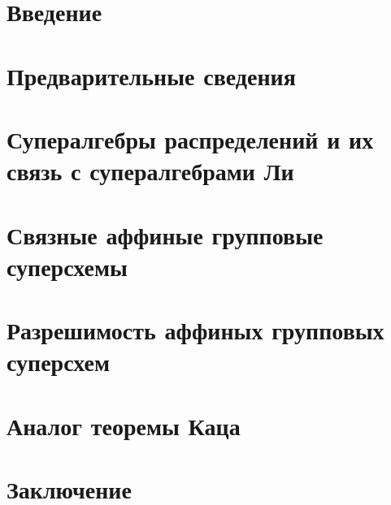 \documentclass[a4paper,12pt]{article}
\begin{document}
  

  \section*{Введение}
    
  
  \newpage

  \tableofcontents

  \newpage
  \section{Предварительные сведения}
    

  \newpage
  \section{Супералгебры распределений и их связь с супералгебрами Ли}
    
  \newpage
  \section{Связные аффиные групповые суперсхемы}
    

  \newpage
  \section{Разрешимость аффиных групповых суперсхем}
    

  \newpage
  \section{Аналог теоремы Каца}
    
 
  \newpage
  \section*{Заключение}
    

  
\end{document}
